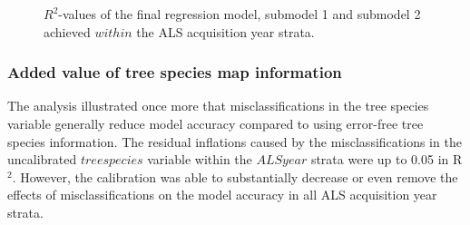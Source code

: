 \begin{figure}[H]
	\centering
	\caption{$R^2$-values of the final regression model, submodel 1 and submodel 2 achieved $within$ the ALS acquisition year strata.}
	\label{fig:r2adj_in_lyears}
\end{figure}


\subsubsection*{Added value of tree species map information}
 The analysis illustrated once more that misclassifications in the tree species variable generally reduce model accuracy compared to using error-free tree species information. The residual inflations caused by the misclassifications in the uncalibrated $treespecies$ variable within the $ALSyear$ strata were up to 0.05 in R$^2$. However, the calibration was able to substantially decrease or even remove the effects of misclassifications on the model accuracy in all ALS acquisition year strata.


